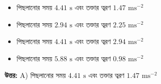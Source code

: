 \documentclass[12pt, a4paper]{article}
\begin{document}
\begin{itemize}[label={}, leftmargin=1cm, itemsep=0.5em]
    \item[\textbf{A)}] পিছলানোর সময় $4.41\text{ s}$ এবং তক্তার ত্বরণ $1.47\text{ ms}^{-2}$
    \item[\textbf{B)}] পিছলানোর সময় $2.94\text{ s}$ এবং তক্তার ত্বরণ $2.25\text{ ms}^{-2}$
    \item[\textbf{C)}] পিছলানোর সময় $4.41\text{ s}$ এবং তক্তার ত্বরণ $2.94\text{ ms}^{-2}$
    \item[\textbf{D)}] পিছলানোর সময় $5.88\text{ s}$ এবং তক্তার ত্বরণ $0.98\text{ ms}^{-2}$
\end{itemize}

\vspace{0.5em}
\begin{tcolorbox}[answerbox]
    \textbf{\color{success} উত্তর:} A) পিছলানোর সময় $4.41\text{ s}$ এবং তক্তার ত্বরণ $1.47\text{ ms}^{-2}$
\end{tcolorbox}
\vspace{1em}
\end{document}
